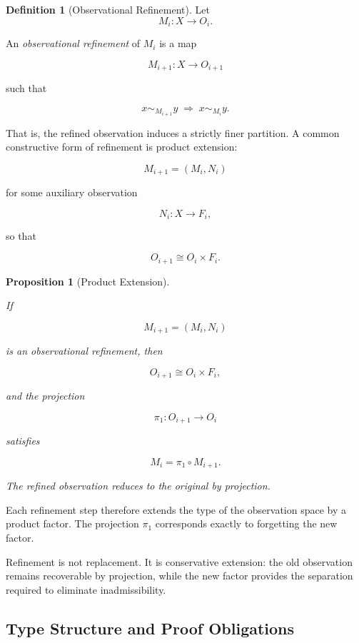 \documentclass[pdflatex,sn-mathphys-num]{sn-jnl}
\theoremstyle{plain}
\newtheorem{proposition}[theorem]{Proposition}
\theoremstyle{definition}
\newtheorem{definition}[theorem]{Definition}
\theoremstyle{remark}
\begin{document}
\begin{definition}[Observational Refinement]

Let
\[
M_i : X \to O_i.
\]

An \emph{observational refinement} of $M_i$ is a map

\[
M_{i+1} : X \to O_{i+1}
\]

such that

\[
x \sim_{M_{i+1}} y
\;\Rightarrow\;
x \sim_{M_i} y.
\]

That is, the refined observation induces a strictly finer partition.
A common constructive form of refinement is product extension:

\[
M_{i+1} = (M_i, N_i)
\]

for some auxiliary observation

\[
N_i : X \to F_i,
\]

so that

\[
O_{i+1} \cong O_i \times F_i.
\]

\end{definition}

\begin{proposition}[Product Extension]
\label{prop:product}

If

\[
M_{i+1} = (M_i, N_i)
\]

is an observational refinement, then

\[
O_{i+1} \cong O_i \times F_i,
\]

and the projection

\[
\pi_1 : O_{i+1} \to O_i
\]

satisfies

\[
M_i = \pi_1 \circ M_{i+1}.
\]

The refined observation reduces to the original by projection.

\end{proposition}

Each refinement step therefore extends the type of the observation
space by a product factor.
The projection $\pi_1$ corresponds exactly to forgetting the new
factor.

Refinement is not replacement.
It is conservative extension: the old observation remains recoverable
by projection, while the new factor provides the separation required
to eliminate inadmissibility.

\subsection{Type Structure and Proof Obligations}
\end{document}
